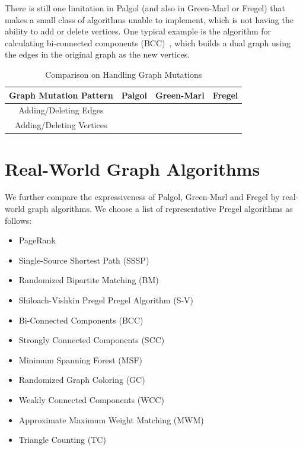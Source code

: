 \documentclass{sokendai_thesis} %
\newcommand{\cmark}{\ding{51}}%
\newcommand{\xmark}{\ding{55}}%
\begin{document}
There is still one limitation in Palgol (and also in Green-Marl or Fregel) that makes a small class of algorithms unable to implement, which is not having the ability to add or delete vertices.
One typical example is the algorithm for calculating bi-connected components (BCC)~\cite{connectivity}, which builds a dual graph using the edges in the original graph as the new vertices.

\begin{table}[t]
 \vspace{-2ex}
 \centering
 \caption{Comparison on Handling Graph Mutations}
 \label{tab:gm}
 \begin{tabular}{c|c|c|c}
  \hline
  \textbf{Graph Mutation Pattern} & Palgol & Green-Marl & Fregel \\
  \hline\hline
  Adding/Deleting Edges & \cmark & \xmark & \xmark \\
  \hline
  Adding/Deleting Vertices & \xmark & \xmark & \xmark \\
  \hline
 \end{tabular}
\vspace{-2ex}\end{table}

\section{Real-World Graph Algorithms}
\label{sec:real-algos}

We further compare the expressiveness of Palgol, Green-Marl and Fregel by real-world graph algorithms.
We choose a list of representative Pregel algorithms as follows:

\begin{itemize}\setlength\itemsep{0em}
 \item PageRank~\cite{pregel}
 \item Single-Source Shortest Path (SSSP)~\cite{pregel}
 \item Randomized Bipartite Matching (BM)~\cite{pregel}
 \item Shiloach-Vishkin Pregel Pregel Algorithm (S-V)~\cite{connectivity}
 \item Bi-Connected Components (BCC)~\cite{connectivity}
 \item Strongly Connected Components (SCC)~\cite{connectivity}
 \item Minimum Spanning Forest (MSF)~\cite{optimizing}
 \item Randomized Graph Coloring (GC)~\cite{optimizing}
 \item Weakly Connected Components (WCC)~\cite{optimizing}
 \item Approximate Maximum Weight Matching (MWM)~\cite{optimizing}
 \item Triangle Counting (TC)~\cite{triangle}
\end{itemize}
\end{document}
